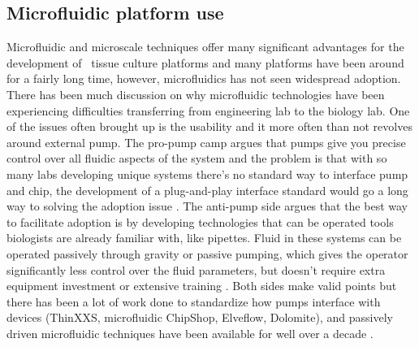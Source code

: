 \subsection{Microfluidic platform use}
Microfluidic and microscale techniques offer many significant advantages for the development of \invitro\ tissue culture platforms and many platforms have been around for a fairly long time, however, microfluidics has not seen widespread adoption. There has been much discussion on why microfluidic technologies have been experiencing difficulties transferring from engineering lab to the biology lab. One of the issues often brought up is the usability and it more often than not revolves around external pump. The pro-pump camp argues that pumps give you precise control over all fluidic aspects of the system and the problem is that with so many labs developing unique systems there's no standard way to interface pump and chip, the development of a plug-and-play interface standard would go a long way to solving the adoption issue \cite{Scott2013, VanHeeren2012}. The anti-pump side argues that the best way to facilitate adoption is by developing technologies that can be operated tools biologists are already familiar with, like pipettes.  Fluid in these systems can be operated passively through gravity or passive pumping, which gives the operator significantly less control over the fluid parameters, but doesn't require extra equipment investment or extensive training \cite{Walker2002, Lee2015}. Both sides make valid points but there has been a lot of work done to standardize how pumps interface with devices (ThinXXS, microfluidic ChipShop, Elveflow, Dolomite), and passively driven microfluidic techniques have been available for well over a decade \cite{Weigl2000}.

